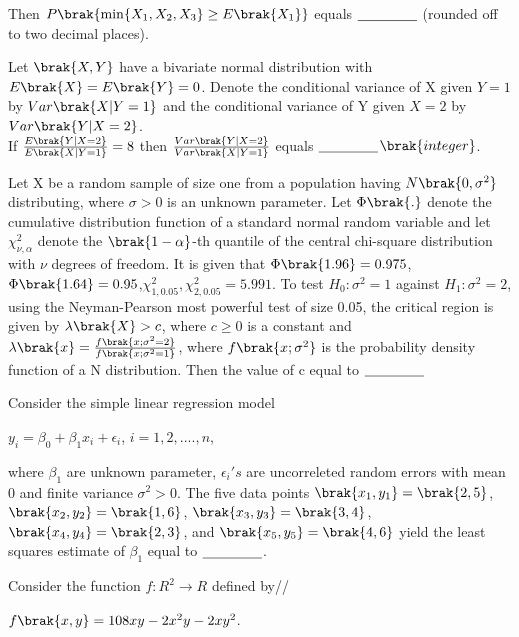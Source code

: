     Then $ P\brak{ \min\{X_1, X_2, X_3\} \geq E\brak{X_1}} $ equals  $\underline{\hspace{1.5 cm}}$ (rounded off to two decimal places).
\item Let $\brak{X, Y}$ have a bivariate normal distribution with $E\brak{X}=E\brak{Y}=0$. Denote the conditional variance of X given $Y=1$ by $Var\brak{X|Y=1}$ and the conditional variance of Y given $X=2$ by $Var\brak{Y|X=2}$.\\
If $\frac{E\brak{Y|X=2}}{E\brak{X|Y=1}}=8$ then $\frac{Var\brak{Y|X=2}}{Var\brak{X|Y=1}}$ equals $\underline{\hspace{1.5 cm}}$$\brak{integer}$.
\item Let X be a random sample of size one from a population having $N\brak{0,\sigma^2}$ distributing, where $\sigma>0$ is an unknown parameter. Let $\Phi\brak{.}$ denote the cumulative distribution function of a standard normal random variable and let  $\chi^2 _{\nu,\alpha}$ denote the $\brak{1-\alpha}$-th quantile of the central chi-square distribution with $\nu$ degrees of freedom. It is given that $\Phi\brak{1.96}=0.975$, $\Phi\brak{1.64}=0.95$,$\chi^2 _{1,0.05},\chi^2 _ {2,0.05}=5.991.$ To test $H_0:\sigma^2=1$ against $H_1:\sigma^2=2$, using the Neyman-Pearson most powerful test of size 0.05, the critical region is given by $\lambda\brak{X}>c$, where $c\geq0$ is a constant and $\lambda\brak{x}=\frac{f\brak{x;\sigma^2=2}}{f\brak{x;\sigma^2 =1}}$, where $f\brak{x;\sigma^2}$ is the probability density function of a N distribution. Then the value of c equal to $\underline{\hspace{1.5 cm}}$
\item Consider the simple linear regression model 
\begin{center}
    $y_i = {\beta}_0 + {\beta}_1 x_i + {\epsilon}_i$, $i=1,2,....,n$, 
\end{center}
where ${\beta}_1$ are unknown parameter, $\epsilon_i 's$ are uncorreleted random errors with mean 0 and finite variance $\sigma^2 > 0$. The five data points $\brak{x_1,y_1}=\brak{2,5}$, $\brak{x_2,y_2}=\brak{1,6}$, $\brak{x_3,y_3}=\brak{3,4}$, $\brak{x_4,y_4}=\brak{2,3}$, and $\brak{x_5,y_5}=\brak{4,6}$ yield the least squares estimate of $\beta_1$ equal to $\underline{\hspace{1.5 cm}}$.
\item Consider the function $f:R^2 \rightarrow R$ defined by//
\begin{center}
$f\brak{x,y}=108xy-2x^2 y - 2xy^2$.
\end{center}
$$
